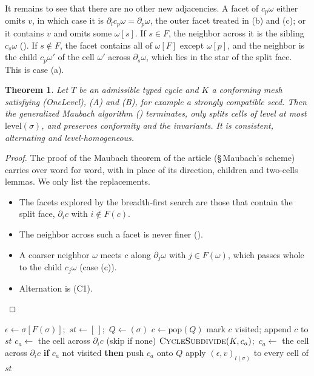 \documentclass[11pt]{article}
\theoremstyle{plain}
\newtheorem{theorem}{Theorem}[section]
\theoremstyle{definition}
\theoremstyle{remark}
\newcommand{\level}{\mathrm{level}}
\begin{document}
It remains to see that there are no other new adjacencies. A facet of
$c_p\omega$ either omits $v$, in which case it is $\partial_l c_p\omega=\partial_p\omega$,
the outer facet treated in (b) and (c); or it contains $v$ and omits some
$\omega[s]$. If $s\in F$, the neighbor across it is the sibling $c_s\omega$
(). If $s\notin F$, the facet contains all of $\omega[F]$
except $\omega[p]$, and the neighbor is the child $c_p\omega'$ of the cell
$\omega'$ across $\partial_s\omega$, which lies in the star of the split
face. This is case (a).

\begin{theorem}\label{thm:cycle}
Let $T$ be an admissible typed cycle and $K$ a conforming mesh satisfying
(OneLevel), (A) and (B), for example a strongly compatible seed. Then the
generalized Maubach algorithm () terminates, only splits
cells of level at most $\level(\sigma)$, and preserves conformity and
the invariants. It is consistent, alternating and level-homogeneous.
\end{theorem}

\begin{proof}
The proof of the Maubach theorem of the article (\S\,Maubach's
scheme) carries over word for word, with 
in place of its direction, children and two-cells lemmas. We only list
the replacements.
\begin{itemize}
\item The facets explored by the breadth-first search are those that
  contain the split face, $\partial_i c$ with $i\notin F(c)$.
\item The neighbor across such a facet is never finer
  ().
\item A coarser neighbor $\omega$ meets $c$ along $\partial_j\omega$ with
  $j\in F(\omega)$, which passes whole to the child $c_j\omega$
  (case (c)).
\item Alternation is (C1).
\end{itemize}
\end{proof}

\begin{algorithm}[t]
\caption{$\textsc{CycleSubdivide}(K,\sigma)$ (\textsc{MaubachSubdivide} with $F$)}
\label{alg:cycle}
\begin{algorithmic}[1]
\State $\epsilon\gets\sigma[F(\sigma)]$;\ $\mathit{st}\gets[\,]$;\ $Q\gets(\sigma)$
  \State $c\gets\mathrm{pop}(Q)$
    \State mark $c$ visited; append $c$ to $\mathit{st}$
     
      \State $c_a\gets$ the cell across $\partial_i c$ (skip if none)
      \If{$\level(c_a)<\level(c)$}
        \State $\textsc{CycleSubdivide}(K,c_a)$;\ $c_a\gets$ the cell across $\partial_i c$
      \EndIf
      \State \textbf{if} $c_a$ not visited \textbf{then} push $c_a$ onto $Q$
    \EndFor
  \EndIf
\EndWhile
\State apply $(\epsilon,v)_{l(\sigma)}$ to every cell of $\mathit{st}$
\end{algorithmic}
\end{algorithm}
\end{document}

